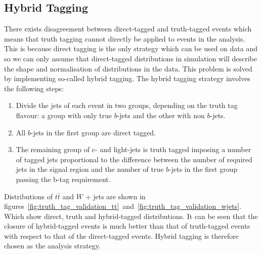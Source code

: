\subsection{Hybrid Tagging}
\label{subsec:hybrid-tagging}
There exists disagreement between direct-tagged and truth-tagged events which
means that truth tagging cannot directly be applied to events in the analysis.
This is because direct tagging is the only strategy which can be used on data
and so we can only assume that direct-tagged distributions in simulation will
describe the shape and normalisation of distributions in the data. This problem
is solved by implementing so-called hybrid tagging. The hybrid tagging strategy
involves the following steps:
\begin{enumerate}
\item Divide the jets of each event in two groups, depending on the truth tag
  flavour: a group with only true $b$-jets and the other with non $b$-jets.
  
\item All $b$-jets in the first group are direct tagged.
  
\item  The remaining group of c- and light-jets is truth tagged imposing a
  number of tagged jets proportional to the difference between the number of
  required jets in the signal region and the number of true $b$-jets in the first
  group passing the b-tag requirement.
\end{enumerate}
Distributions of $t\bar{t}$ and $W$ + jets are shown in
figures~\ref{fig:truth_tag_validation_tt}~and~\ref{fig:truth_tag_validation_wjets}.
Which show direct, truth and hybrid-tagged distributions. It can be seen that
the closure of hybrid-tagged events is much better than that of truth-tagged
events with respect to that of the direct-tagged events. Hybrid tagging is
therefore chosen as the analysis strategy.


\clearpage
\newpage
